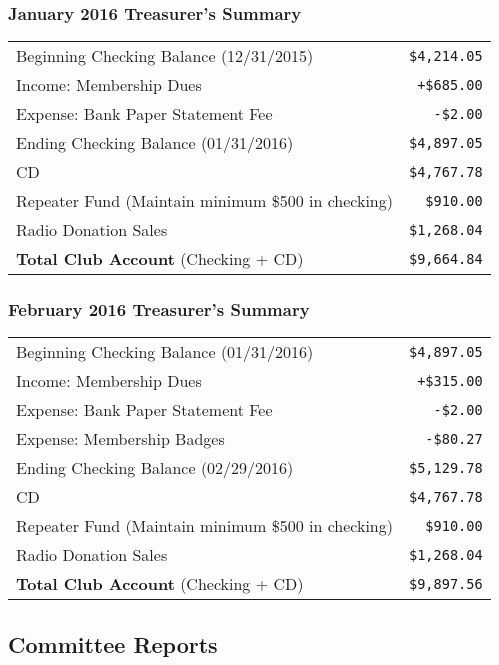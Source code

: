 \documentclass[10pt,letterpaper]{article}
\begin{document}
\subsubsection{January 2016 Treasurer's Summary}
\noindent
\begin{tabular}{|l|r|}
  \hline
  Beginning Checking Balance (12/31/2015) & \texttt{\$4,214.05} \\
  Income: Membership Dues & \texttt{+\$685.00} \\
  Expense: Bank Paper Statement Fee & \texttt{-\$2.00} \\
  Ending Checking Balance (01/31/2016) & \texttt{\$4,897.05} \\
  \hline
  \hline
  CD & \texttt{\$4,767.78} \\
  \hline
  \hline
  Repeater Fund (Maintain minimum \$500 in checking) & \texttt{\$910.00} \\
  \hline
  \hline
  Radio Donation Sales & \texttt{\$1,268.04} \\
  \hline
  \hline
  \textbf{Total Club Account} (Checking + CD) & \texttt{\$9,664.84} \\
  \hline
\end{tabular}

\subsubsection{February 2016 Treasurer's Summary}
\noindent
\begin{tabular}{|l|r|}
  \hline
  Beginning Checking Balance (01/31/2016) & \texttt{\$4,897.05} \\
  Income: Membership Dues & \texttt{+\$315.00} \\
  Expense: Bank Paper Statement Fee & \texttt{-\$2.00} \\
  Expense: Membership Badges & \texttt{-\$80.27} \\
  Ending Checking Balance (02/29/2016) & \texttt{\$5,129.78} \\
  \hline
  \hline
  CD & \texttt{\$4,767.78} \\
  \hline
  \hline
  Repeater Fund (Maintain minimum \$500 in checking) & \texttt{\$910.00} \\
  \hline
  \hline
  Radio Donation Sales & \texttt{\$1,268.04} \\
  \hline
  \hline
  \textbf{Total Club Account} (Checking + CD) & \texttt{\$9,897.56} \\
  \hline
\end{tabular}

\subsection{Committee Reports}
\end{document}
